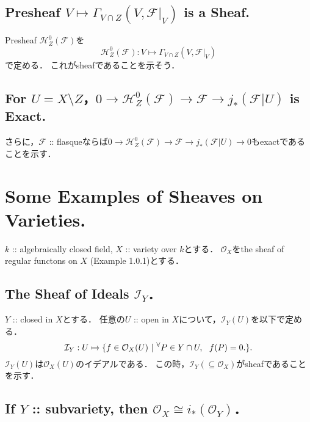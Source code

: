 \documentclass[a4paper]{jsarticle}
\newcommand{\shF}{\mathcal{F}}
\newcommand{\shI}{\mathcal{I}}
\begin{document}
    \subsection{Presheaf $V \mapsto \Gamma_{V \cap Z}(V, \shF|_V)$ is a Sheaf.}
    Presheaf $\mathscr{H}_Z^0(\shF)$を
    \[ \mathscr{H}_Z^0(\shF): V \mapsto \Gamma_{V \cap Z}(V, \shF|_V) \]
    で定める．
    これがsheafであることを示そう．

    \subsection{For $U=X \setminus Z$，$0 \to \mathscr{H}_Z^0(\shF) \to \shF \to j_*(\shF|U)$ is Exact.}
    さらに，$\shF$ :: flasqueならば$0 \to \mathscr{H}_Z^0(\shF) \to \shF \to j_*(\shF|U) \to 0$もexactであることを示す．

\section{Some Examples of Sheaves on Varieties.} %
    $k$ :: algebraically closed field, $X$ :: variety over $k$とする．
    $\mathcal{O}_X$をthe sheaf of regular functons on $X$ (Example 1.0.1)とする．
    \subsection{The Sheaf of Ideals $\shI_Y$．}
    $Y$ :: closed in $X$とする．
    任意の$U$ :: open in $X$について，$\shI_Y(U)$を以下で定める．
    \[ \shI_Y: U \mapsto \{ f \in \mathcal{O}_X(U) ~|~ \Forall{P \in Y \cap U} f(P)=0. \}. \]
    $\shI_Y(U)$は$\mathcal{O}_X(U)$のイデアルである．
    この時，$\shI_Y (\subseteq \mathcal{O}_X)$がsheafであることを示す．

    \subsection{If $Y$ :: subvariety, then $\mathcal{O}_X \cong i_*(\mathcal{O}_Y)$．}

    \subsection{ }
    \subsection{ }
    \subsection{ }
\end{document}
